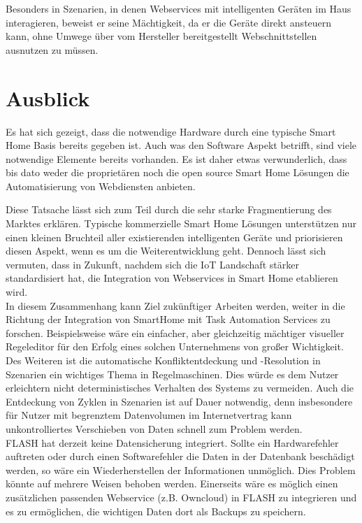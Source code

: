 Besonders in Szenarien, in denen Webservices mit intelligenten Geräten im Haus interagieren, beweist er seine Mächtigkeit, da er die Geräte direkt ansteuern kann, ohne Umwege über vom Hersteller bereitgestellt Webschnittstellen ausnutzen zu müssen. 






\section{Ausblick}
Es hat sich gezeigt, dass die notwendige Hardware durch eine typische Smart Home Basis bereits gegeben ist. Auch was den Software Aspekt betrifft, sind viele notwendige Elemente bereits vorhanden. Es ist daher etwas verwunderlich, dass bis dato weder die proprietären noch die open source Smart Home Lösungen die Automatisierung von Webdiensten anbieten. 

Diese Tatsache lässt sich zum Teil durch die sehr starke Fragmentierung des Marktes erklären. Typische kommerzielle Smart Home Lösungen unterstützen nur einen kleinen Bruchteil aller existierenden intelligenten Geräte und priorisieren diesen Aspekt, wenn es um die Weiterentwicklung geht. Dennoch lässt sich vermuten, dass in Zukunft, nachdem sich die IoT Landschaft stärker standardisiert hat, die Integration von Webservices in Smart Home etablieren wird.\\

In diesem Zusammenhang kann Ziel zukünftiger Arbeiten werden, weiter in die Richtung der Integration von SmartHome mit Task Automation Services zu forschen. Beispielsweise wäre ein einfacher, aber gleichzeitig mächtiger visueller Regeleditor für den Erfolg eines solchen Unternehmens von großer Wichtigkeit. \\

Des Weiteren ist die automatische Konfliktentdeckung und -Resolution in Szenarien ein wichtiges Thema in Regelmaschinen. Dies würde es dem Nutzer erleichtern nicht deterministisches Verhalten des Systems zu vermeiden. Auch die Entdeckung von Zyklen in Szenarien ist auf Dauer notwendig, denn insbesondere für Nutzer mit begrenztem Datenvolumen im Internetvertrag kann unkontrolliertes Verschieben von Daten schnell zum Problem werden.\\

FLASH hat derzeit keine Datensicherung integriert. Sollte ein Hardwarefehler auftreten oder durch einen Softwarefehler die Daten in der Datenbank beschädigt werden, so wäre ein Wiederherstellen der Informationen unmöglich. Dies Problem könnte auf mehrere Weisen behoben werden. Einerseits wäre es möglich einen zusätzlichen passenden Webservice (z.B. Owncloud) in FLASH zu integrieren und es zu ermöglichen, die wichtigen Daten dort als Backups zu speichern. 


